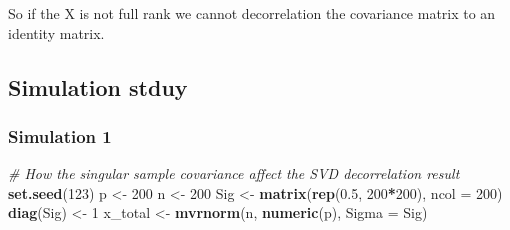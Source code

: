 \documentclass[]{article}
\newenvironment{Shaded}{\begin{snugshade}}{\end{snugshade}}
\newcommand{\KeywordTok}[1]{\textcolor[rgb]{0.13,0.29,0.53}{\textbf{#1}}}
\newcommand{\DataTypeTok}[1]{\textcolor[rgb]{0.13,0.29,0.53}{#1}}
\newcommand{\DecValTok}[1]{\textcolor[rgb]{0.00,0.00,0.81}{#1}}
\newcommand{\FloatTok}[1]{\textcolor[rgb]{0.00,0.00,0.81}{#1}}
\newcommand{\StringTok}[1]{\textcolor[rgb]{0.31,0.60,0.02}{#1}}
\newcommand{\CommentTok}[1]{\textcolor[rgb]{0.56,0.35,0.01}{\textit{#1}}}
\newcommand{\OperatorTok}[1]{\textcolor[rgb]{0.81,0.36,0.00}{\textbf{#1}}}
\newcommand{\NormalTok}[1]{#1}
\begin{document}
So if the X is not full rank we cannot decorrelation the covariance
matrix to an identity matrix.

\subsection{Simulation stduy}\label{simulation-stduy}

\subsubsection{Simulation 1}\label{simulation-1}

\begin{Shaded}
\begin{Highlighting}[]
\CommentTok{# How the singular sample covariance affect the SVD decorrelation result}
\KeywordTok{set.seed}\NormalTok{(}\DecValTok{123}\NormalTok{)}
\NormalTok{p <-}\StringTok{ }\DecValTok{200}
\NormalTok{n <-}\StringTok{ }\DecValTok{200}
\NormalTok{Sig <-}\StringTok{ }\KeywordTok{matrix}\NormalTok{(}\KeywordTok{rep}\NormalTok{(}\FloatTok{0.5}\NormalTok{, }\DecValTok{200}\OperatorTok{*}\DecValTok{200}\NormalTok{), }\DataTypeTok{ncol =} \DecValTok{200}\NormalTok{)}
\KeywordTok{diag}\NormalTok{(Sig) <-}\StringTok{ }\DecValTok{1}
\NormalTok{x_total <-}\StringTok{ }\KeywordTok{mvrnorm}\NormalTok{(n, }\KeywordTok{numeric}\NormalTok{(p), }\DataTypeTok{Sigma =}\NormalTok{ Sig)}


\end{Highlighting}
\end{Shaded}
\end{document}
